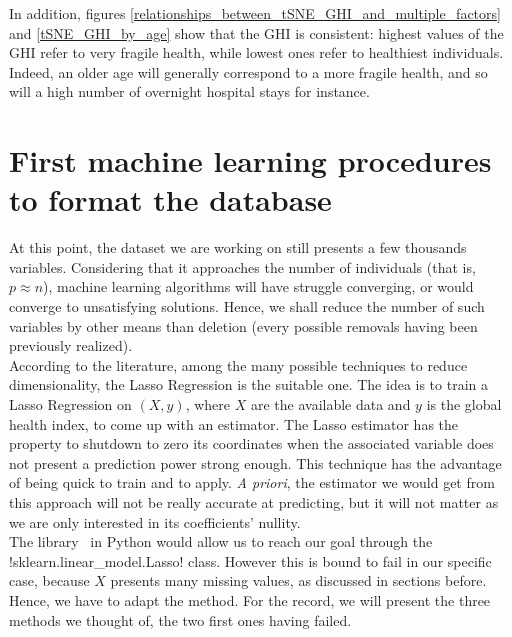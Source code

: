 \documentclass[]{article}
\begin{document}
\noindent
In addition, figures \ref{relationships_between_tSNE_GHI_and_multiple_factors} and \ref{tSNE_GHI_by_age} show that the GHI is consistent: highest values of the GHI refer to very fragile health, while lowest ones refer to healthiest individuals. Indeed, an older age will generally correspond to a more fragile health, and so will a high number of overnight hospital stays for instance.

\section{First machine learning procedures to format the database}
At this point, the dataset we are working on still presents a few thousands variables. Considering that it approaches the number of individuals (that is, $p \approx n$), machine learning algorithms will have struggle converging, or would converge to unsatisfying solutions. Hence, we shall reduce the number of such variables by other means than deletion (every possible removals having been previously realized).\\
According to the literature, among the many possible techniques to reduce dimensionality, the Lasso Regression is the suitable one. The idea is to train a Lasso Regression on $(X, y)$, where $X$ are the available data and $y$ is the global health index, to come up with an estimator. The Lasso estimator has the property to shutdown to zero its coordinates when the associated variable does not present a prediction power strong enough. This technique has the advantage of being quick to train and to apply. \textit{A priori}, the estimator we would get from this approach will not be really accurate at predicting, but it will not matter as we are only interested in its coefficients' nullity.\\
The library \sklearn\, in Python would allow us to reach our goal through the \pyth!sklearn.linear_model.Lasso! class. However this is bound to fail in our specific case, because $X$ presents many missing values, as discussed in sections before. Hence, we have to adapt the method. For the record, we will present the three methods we thought of, the two first ones having failed.
\end{document}
